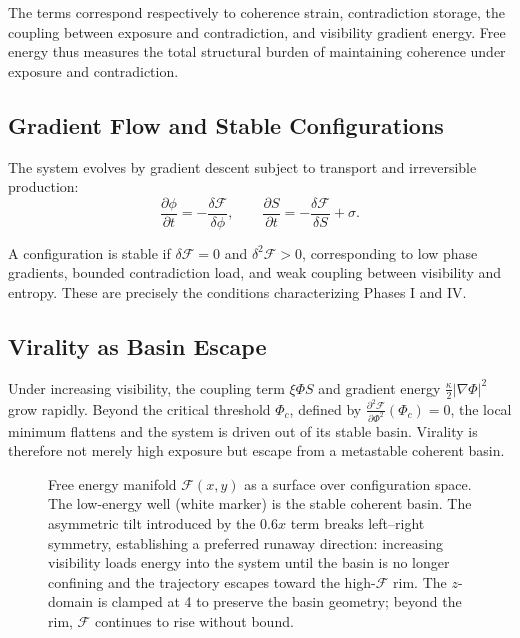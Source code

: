 \documentclass[12pt,a4paper]{article}
\begin{document}
The terms correspond respectively to coherence strain, contradiction storage, the coupling between exposure and contradiction, and visibility gradient energy. Free energy thus measures the total structural burden of maintaining coherence under exposure and contradiction.

\subsection{Gradient Flow and Stable Configurations}

The system evolves by gradient descent subject to transport and irreversible production:
\[
\frac{\partial \phi}{\partial t} = - \frac{\delta \mathcal{F}}{\delta \phi},
\qquad
\frac{\partial S}{\partial t} = - \frac{\delta \mathcal{F}}{\delta S} + \sigma.
\]

A configuration is stable if $\delta\mathcal{F} = 0$ and $\delta^2\mathcal{F} > 0$, corresponding to low phase gradients, bounded contradiction load, and weak coupling between visibility and entropy. These are precisely the conditions characterizing Phases I and IV.

\subsection{Virality as Basin Escape}

Under increasing visibility, the coupling term $\xi\Phi S$ and gradient energy $\frac{\kappa}{2}|\nabla\Phi|^2$ grow rapidly. Beyond the critical threshold $\Phi_c$, defined by $\frac{\partial^2\mathcal{F}}{\partial\Phi^2}(\Phi_c) = 0$, the local minimum flattens and the system is driven out of its stable basin. Virality is therefore not merely high exposure but escape from a metastable coherent basin.

\begin{figure}[htbp]
\centering
{}
\caption{Free energy manifold $\mathcal{F}(x,y)$ as a surface over configuration space. The low-energy well (white marker) is the stable coherent basin. The asymmetric tilt introduced by the $0.6x$ term breaks left--right symmetry, establishing a preferred runaway direction: increasing visibility loads energy into the system until the basin is no longer confining and the trajectory escapes toward the high-$\mathcal{F}$ rim. The $z$-domain is clamped at 4 to preserve the basin geometry; beyond the rim, $\mathcal{F}$ continues to rise without bound.}
\end{figure}
\end{document}
